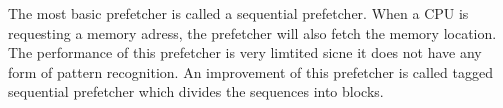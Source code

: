 The most basic prefetcher is called a sequential prefetcher. When a CPU is requesting a memory adress, the prefetcher will also fetch the memory location. The performance of this prefetcher is very limtited sicne it does not have any form of pattern recognition. An improvement of this prefetcher is called tagged sequential prefetcher which divides the sequences into blocks.
	

